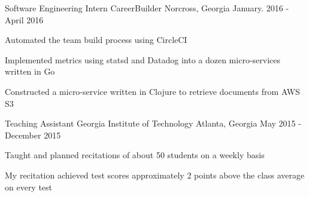 

\begin{cventries}

  \cventry
    {Software Engineering Intern} %
    {CareerBuilder} %
    {Norcross, Georgia} %
    {January. 2016 - April 2016} %
    {
      \begin{cvitems} %
        \item {Automated the team build process using CircleCI}
        \item {Implemented metrics using statsd and Datadog into a dozen micro-services written in Go}
        \item {Constructed a micro-service written in Clojure to retrieve documents from AWS S3}
      \end{cvitems}
    }

  \cventry
    {Teaching Assistant} %
    {Georgia Institute of Technology} %
    {Atlanta, Georgia} %
    {May 2015 - December 2015} %
    {
      \begin{cvitems} %
        \item {Taught and planned recitations of about 50 students on a weekly basis}
        \item {My recitation achieved test scores approximately 2 points above the class average on every test}
      \end{cvitems}
    }


\end{cventries}
